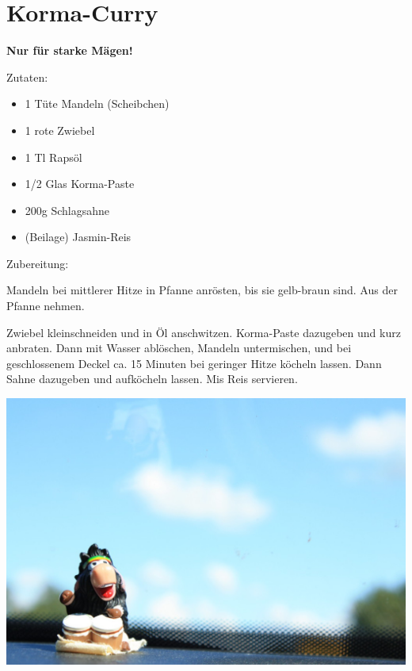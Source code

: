 \section{Korma-Curry}
\textbf{Nur für starke Mägen!}

Zutaten:
\begin{itemize}
    \item 1 Tüte Mandeln (Scheibchen)
    \item 1 rote Zwiebel
    \item 1 Tl Rapsöl
    \item 1/2 Glas Korma-Paste
    \item 200g Schlagsahne
    \item (Beilage) Jasmin-Reis
\end{itemize}

\noindent Zubereitung:

\noindent Mandeln bei mittlerer Hitze in Pfanne anrösten, bis sie gelb-braun
sind. Aus der Pfanne nehmen.

Zwiebel kleinschneiden und in Öl anschwitzen. Korma-Paste dazugeben und kurz
anbraten. Dann mit Wasser ablöschen, Mandeln untermischen, und bei
geschlossenem Deckel ca. 15 Minuten bei geringer Hitze köcheln lassen. Dann
Sahne dazugeben und aufköcheln lassen. Mis Reis servieren.

\newpage
\mbox{}
\vfill
\begin{center}
    \includegraphics[width=\textwidth]{Korma/IMG_3250_small.jpg}
\end{center}
\vfill
\mbox{ }
\newpage
